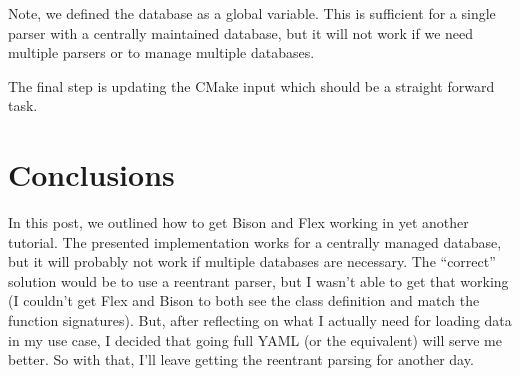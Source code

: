 \documentclass{article}
\begin{document}
\begin{code block}
    
\end{code block}

Note, we defined the database as a global variable.  This is sufficient
for a single parser with a centrally maintained database, but it will
not work if we need multiple parsers or to manage multiple databases.

The final step is updating the CMake input which should be a straight
forward task.

\begin{code block}
    
\end{code block}

\section{Conclusions}

In this post, we outlined how to get Bison and Flex working in yet
another tutorial.  The presented implementation works for a centrally
managed database, but it will probably not work if multiple databases
are necessary.  The ``correct'' solution would be to use a reentrant
parser, but I wasn't able to get that working (I couldn't get Flex and
Bison to both see the class definition and match the function
signatures).  But, after reflecting on what I actually need for loading
data in my use case, I decided that going full YAML (or the equivalent)
will serve me better.  So with that, I'll leave getting the reentrant
parsing for another day.



\end{document}
